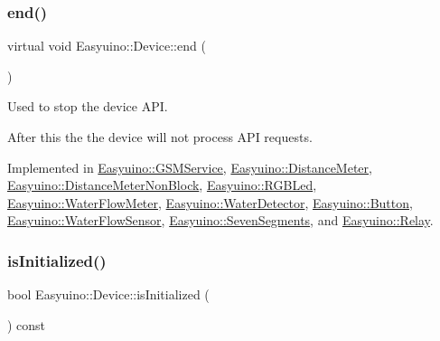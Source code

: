 \mbox{\label{class_easyuino_1_1_device_ab31018ef64adc84aa2ea575b2297548f}} 
\subsubsection{\texorpdfstring{end()}{end()}}
{\footnotesize\ttfamily virtual void Easyuino\+::\+Device\+::end (\begin{DoxyParamCaption}{ }\end{DoxyParamCaption})\hspace{0.3cm}{\ttfamily [pure virtual]}}



Used to stop the device A\+PI. 

After this the the device will not process A\+PI requests. 

Implemented in \hyperlink{class_easyuino_1_1_g_s_m_service_a05bef783773776ec209608aa81d1ff45}{Easyuino\+::\+G\+S\+M\+Service}, \hyperlink{class_easyuino_1_1_distance_meter_a8a818cc922418ae5a078193dbfab1e6b}{Easyuino\+::\+Distance\+Meter}, \hyperlink{class_easyuino_1_1_distance_meter_non_block_a845d4db657ff408205d1cdb3c35982a4}{Easyuino\+::\+Distance\+Meter\+Non\+Block}, \hyperlink{class_easyuino_1_1_r_g_b_led_ad0e9fb0da405c537e876c8a2dc22246e}{Easyuino\+::\+R\+G\+B\+Led}, \hyperlink{class_easyuino_1_1_water_flow_meter_a47024d4da9568e42743a875c08c33121}{Easyuino\+::\+Water\+Flow\+Meter}, \hyperlink{class_easyuino_1_1_water_detector_a9c1473536f47b2a7d8e1f8fb1bf5f3fd}{Easyuino\+::\+Water\+Detector}, \hyperlink{class_easyuino_1_1_button_a0742235d911c24e7b3505f9655176532}{Easyuino\+::\+Button}, \hyperlink{class_easyuino_1_1_water_flow_sensor_a7f31ac7735b049394d34cfbc37f17359}{Easyuino\+::\+Water\+Flow\+Sensor}, \hyperlink{class_easyuino_1_1_seven_segments_afea49385382a7b9c597b4fe42a003fee}{Easyuino\+::\+Seven\+Segments}, and \hyperlink{class_easyuino_1_1_relay_a2b57237c996a6ffe8e900ae273bce9d4}{Easyuino\+::\+Relay}.

\mbox{\label{class_easyuino_1_1_device_a3761bc02cb81ca0833b535ecaf9a7659}} 
\subsubsection{\texorpdfstring{is\+Initialized()}{isInitialized()}}
{\footnotesize\ttfamily bool Easyuino\+::\+Device\+::is\+Initialized (\begin{DoxyParamCaption}{ }\end{DoxyParamCaption}) const}



